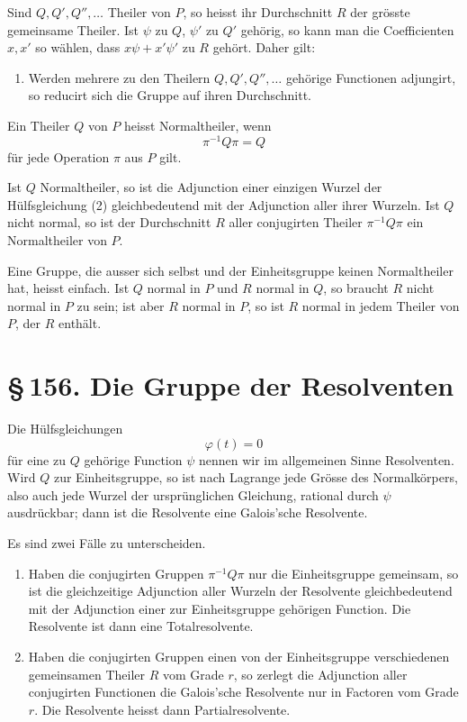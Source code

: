 \documentclass[11pt]{article}
\providecommand{\sect}[2]{\section*{\S\,#1. #2}}
\begin{document}
Sind $Q,Q',Q'',\ldots$ Theiler von $P$, so heisst ihr Durchschnitt $R$ der grösste gemeinsame Theiler. Ist $\psi$ zu $Q$, $\psi'$ zu $Q'$ gehörig, so kann man die Coefficienten $x,x'$ so wählen, dass $x\psi+x'\psi'$ zu $R$ gehört. Daher gilt:
\begin{enumerate}[label=\arabic*.,leftmargin=2em,start=4]
\item Werden mehrere zu den Theilern $Q,Q',Q'',\ldots$ gehörige Functionen adjungirt, so reducirt sich die Gruppe auf ihren Durchschnitt.
\end{enumerate}

Ein Theiler $Q$ von $P$ heisst Normaltheiler, wenn
\[
        \pi^{-1}Q\pi=Q
\]
für jede Operation $\pi$ aus $P$ gilt.

Ist $Q$ Normaltheiler, so ist die Adjunction einer einzigen Wurzel der Hülfsgleichung (2) gleichbedeutend mit der Adjunction aller ihrer Wurzeln. Ist $Q$ nicht normal, so ist der Durchschnitt $R$ aller conjugirten Theiler $\pi^{-1}Q\pi$ ein Normaltheiler von $P$.

Eine Gruppe, die ausser sich selbst und der Einheitsgruppe keinen Normaltheiler hat, heisst einfach. Ist $Q$ normal in $P$ und $R$ normal in $Q$, so braucht $R$ nicht normal in $P$ zu sein; ist aber $R$ normal in $P$, so ist $R$ normal in jedem Theiler von $P$, der $R$ enthält.

\sect{156}{Die Gruppe der Resolventen}

Die Hülfsgleichungen
\[
        \varphi(t)=0
\]
für eine zu $Q$ gehörige Function $\psi$ nennen wir im allgemeinen Sinne Resolventen. Wird $Q$ zur Einheitsgruppe, so ist nach Lagrange jede Grösse des Normalkörpers, also auch jede Wurzel der ursprünglichen Gleichung, rational durch $\psi$ ausdrückbar; dann ist die Resolvente eine Galois'sche Resolvente.

Es sind zwei Fälle zu unterscheiden.

\begin{enumerate}[label=\arabic*.,leftmargin=2em]
\item Haben die conjugirten Gruppen $\pi^{-1}Q\pi$ nur die Einheitsgruppe gemeinsam, so ist die gleichzeitige Adjunction aller Wurzeln der Resolvente gleichbedeutend mit der Adjunction einer zur Einheitsgruppe gehörigen Function. Die Resolvente ist dann eine Totalresolvente.
\item Haben die conjugirten Gruppen einen von der Einheitsgruppe verschiedenen gemeinsamen Theiler $R$ vom Grade $r$, so zerlegt die Adjunction aller conjugirten Functionen die Galois'sche Resolvente nur in Factoren vom Grade $r$. Die Resolvente heisst dann Partialresolvente.
\end{enumerate}
\end{document}
